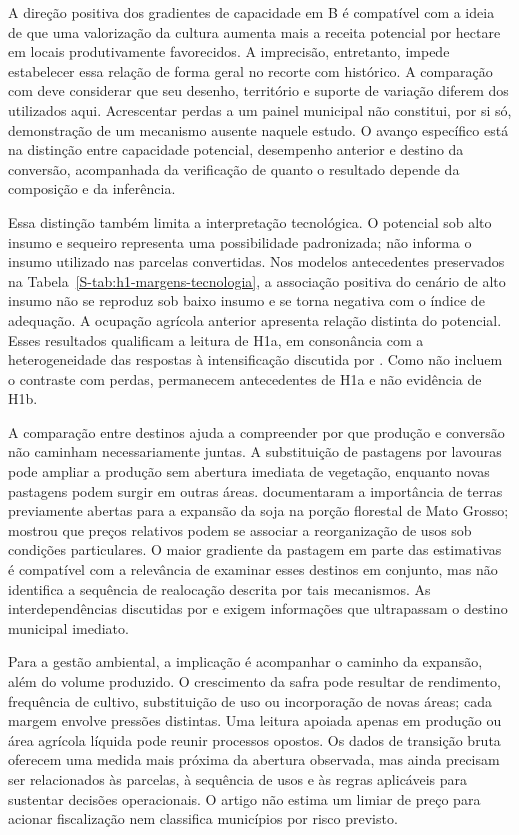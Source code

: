 A direção positiva dos gradientes de capacidade em B é compatível com a ideia de que uma valorização da cultura aumenta mais a receita potencial por hectare em locais produtivamente favorecidos. A imprecisão, entretanto, impede estabelecer essa relação de forma geral no recorte com histórico. A comparação com  deve considerar que seu desenho, território e suporte de variação diferem dos utilizados aqui. Acrescentar perdas a um painel municipal não constitui, por si só, demonstração de um mecanismo ausente naquele estudo. O avanço específico está na distinção entre capacidade potencial, desempenho anterior e destino da conversão, acompanhada da verificação de quanto o resultado depende da composição e da inferência.

Essa distinção também limita a interpretação tecnológica. O potencial sob alto insumo e sequeiro representa uma possibilidade padronizada; não informa o insumo utilizado nas parcelas convertidas. Nos modelos antecedentes preservados na Tabela~\ref{S-tab:h1-margens-tecnologia}, a associação positiva do cenário de alto insumo não se reproduz sob baixo insumo e se torna negativa com o índice de adequação. A ocupação agrícola anterior apresenta relação distinta do potencial. Esses resultados qualificam a leitura de H1a, em consonância com a heterogeneidade das respostas à intensificação discutida por . Como não incluem o contraste com perdas, permanecem antecedentes de H1a e não evidência de H1b.

A comparação entre destinos ajuda a compreender por que produção e conversão não caminham necessariamente juntas. A substituição de pastagens por lavouras pode ampliar a produção sem abertura imediata de vegetação, enquanto novas pastagens podem surgir em outras áreas.  documentaram a importância de terras previamente abertas para a expansão da soja na porção florestal de Mato Grosso;  mostrou que preços relativos podem se associar a reorganização de usos sob condições particulares. O maior gradiente da pastagem em parte das estimativas é compatível com a relevância de examinar esses destinos em conjunto, mas não identifica a sequência de realocação descrita por tais mecanismos. As interdependências discutidas por  e  exigem informações que ultrapassam o destino municipal imediato.

Para a gestão ambiental, a implicação é acompanhar o caminho da expansão, além do volume produzido. O crescimento da safra pode resultar de rendimento, frequência de cultivo, substituição de uso ou incorporação de novas áreas; cada margem envolve pressões distintas. Uma leitura apoiada apenas em produção ou área agrícola líquida pode reunir processos opostos. Os dados de transição bruta oferecem uma medida mais próxima da abertura observada, mas ainda precisam ser relacionados às parcelas, à sequência de usos e às regras aplicáveis para sustentar decisões operacionais. O artigo não estima um limiar de preço para acionar fiscalização nem classifica municípios por risco previsto.

